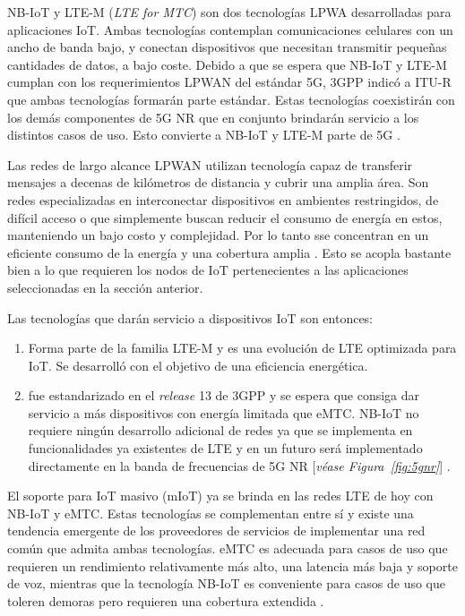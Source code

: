 NB-IoT y LTE-M (\textit{LTE for MTC}) son dos tecnologías LPWA desarrolladas para aplicaciones IoT. Ambas tecnologías contemplan comunicaciones celulares con un ancho de banda bajo, y conectan dispositivos que necesitan transmitir pequeñas cantidades de datos, a bajo coste. Debido a que se espera que NB-IoT y LTE-M cumplan con los requerimientos LPWAN del estándar 5G, 3GPP indicó a ITU-R que ambas tecnologías formarán parte estándar. Estas tecnologías coexistirán con los demás componentes de 5G NR que en conjunto brindarán servicio a los distintos casos de uso. Esto convierte a NB-IoT y LTE-M parte de 5G \parencite{EricssonAB2016}. \newline

Las redes de largo alcance LPWAN utilizan tecnología capaz de transferir mensajes a decenas de kilómetros de distancia y cubrir una amplia área. Son redes especializadas en interconectar dispositivos en ambientes restringidos, de difícil acceso o que simplemente buscan reducir el consumo de energía en estos, manteniendo un bajo costo y complejidad. Por lo tanto sse concentran en un eficiente consumo de la energía y una cobertura amplia \parencite{NetTrafficIoT}. Esto se acopla bastante bien a lo que requieren los nodos de IoT pertenecientes a las aplicaciones seleccionadas en la sección anterior. \newline

Las tecnologías que darán servicio a dispositivos IoT son entonces:

\begin{enumerate}
    \item \textit{} Forma parte de la familia LTE-M y es una evolución de LTE optimizada para IoT. Se desarrolló con el objetivo de una eficiencia energética.
    \item \textit{} fue estandarizado en el \textit{release }13 de 3GPP y se espera que consiga dar servicio a más dispositivos con energía limitada que eMTC. NB-IoT no requiere ningún desarrollo adicional de redes ya que se implementa en funcionalidades ya existentes de LTE \parencite{NetTrafficIoT} y en un futuro será implementado directamente en la banda de frecuencias de 5G NR [\textit{véase Figura~\ref{fig:5gnr}}] \parencite{EricssonAB2016}.
\end{enumerate}

El soporte para IoT masivo (mIoT) ya se brinda en las redes LTE de hoy con NB-IoT y eMTC. Estas tecnologías se complementan entre sí y existe una tendencia emergente de los proveedores de servicios de implementar una red común que admita ambas tecnologías. eMTC es adecuada para casos de uso que requieren un rendimiento relativamente más alto, una latencia más baja y soporte de voz, mientras que la tecnología NB-IoT es conveniente para casos de uso que toleren demoras pero requieren una cobertura extendida \parencite{EricssonAB2016}. \newline

